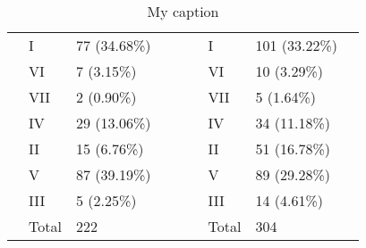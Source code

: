 \begin{table}[]
{\begin{tabular}{|l|l|l|l|l|l|l|l|l|}
 & I & 77 (34.68\%) &  &  &  & I & 101 (33.22\%) &  \\ \cline{2-3} \cline{7-8}
 & VI & 7 (3.15\%) &  &  &  & VI & 10 (3.29\%) &  \\ \cline{2-3} \cline{7-8}
 & VII & 2 (0.90\%) &  &  &  & VII & 5 (1.64\%) &  \\ \cline{2-3} \cline{7-8}
 & IV & 29 (13.06\%) &  &  &  & IV & 34 (11.18\%) &  \\ \cline{2-3} \cline{7-8}
 & II & 15 (6.76\%) &  &  &  & II & 51 (16.78\%) &  \\ \cline{2-3} \cline{7-8}
 & V & 87 (39.19\%) &  &  &  & V & 89 (29.28\%) &  \\ \cline{2-3} \cline{7-8}
 & III & 5 (2.25\%) &  &  &  & III & 14 (4.61\%) &  \\ \cline{2-3} \cline{7-8}
 & Total & 222 &  &  &  & Total & 304 &  \\ \cline{1-4} \cline{6-9}
\end{tabular}
}
\caption{My caption}
\label{my-label}
\end{table}


